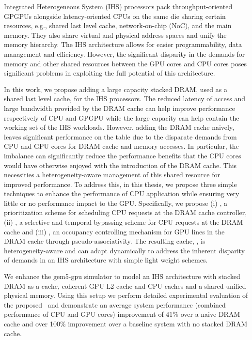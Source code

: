 \par Integrated Heterogeneous System (IHS) processors pack throughput-oriented GPGPUs alongside latency-oriented CPUs on the same die sharing certain resources, e.g., shared last level cache, network-on-chip (NoC), and the main memory. They also share virtual and physical address spaces and unify the memory hierarchy. The IHS architecture allows for easier programmability, data management and efficiency. However, the significant disparity in the demands for memory and other shared resources between the GPU cores and CPU cores poses significant problems in exploiting the full potential of this architecture.
\par In this work, we propose adding a large capacity stacked DRAM, used as a shared last level cache, for the IHS processors. The reduced latency of access and large bandwidth provided by the DRAM cache can help improve performance respectively of CPU and GPGPU while the large capacity can help contain the working set of the IHS workloads. However, adding the DRAM cache naively, leaves significant performance on the table due to the disparate demands from CPU and GPU cores for DRAM cache and memory accesses. 
In particular, the imbalance can significantly reduce the performance benefits that the CPU cores would have otherwise enjoyed with the introduction of the DRAM cache. This necessities a heterogeneity-aware management of this shared resource for improved performance. To address this, in this thesis, we propose three simple techniques to enhance the performance of CPU application while ensuring very little or no performance impact to the GPU. Specifically, we propose (i) \prioname, a prioritization scheme for scheduling CPU
requests at the DRAM cache controller, (ii) \bypassname, a selective and temporal bypassing scheme for CPU requests at the DRAM cache and (iii) \chaining, an occupancy controlling mechanism for GPU lines in the DRAM cache through pseudo-associativity. The resulting cache, \cachename, is heterogeneity-aware and can adapt dynamically to address the inherent disparity of demands in an IHS architecture with simple light weight schemes. 
\par We enhance the gem5-gpu simulator to model an IHS architecture with stacked DRAM as a cache, coherent GPU L2 cache and CPU caches and a shared unified physical memory. Using this setup we perform detailed experimental evaluation of the proposed \cachename\ and demonstrate an average system performance (combined performance of CPU  and GPU cores) improvement of 41\% over a naive DRAM cache and over 100\% improvement over a baseline system with no stacked DRAM cache.
